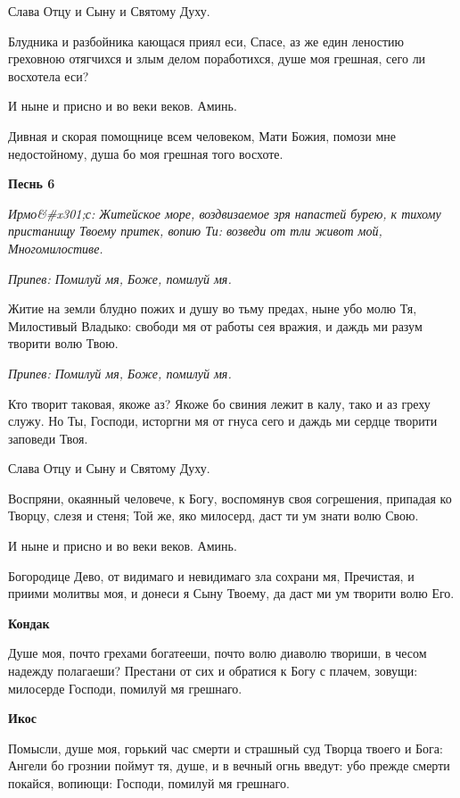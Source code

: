 Слава Отцу и Сыну и Святому Духу.


Блудника и разбойника кающася приял еси, Спасе, аз же един леностию греховною отягчихся и злым делом поработихся, душе моя грешная, сего ли восхотела еси?


И ныне и присно и во веки веков. Аминь.


Дивная и скорая помощнице всем человеком, Мати Божия, помози мне недостойному, душа бо моя грешная того восхоте.




\bfseries Песнь 6\normalfont{}


\itshape Ирмо&#x301;с:\normalfont{} Житейское море, воздвизаемое зря напастей бурею, к тихому пристанищу Твоему притек, вопию Ти: возведи от тли живот мой, Многомилостиве.


\itshape Припев:\normalfont{} Помилуй мя, Боже, помилуй мя.


Житие на земли блудно пожих и душу во тьму предах, ныне убо молю Тя, Милостивый Владыко: свободи мя от работы сея вражия, и даждь ми разум творити волю Твою.


\itshape Припев:\normalfont{} Помилуй мя, Боже, помилуй мя.


Кто творит таковая, якоже аз? Якоже бо свиния лежит в калу, тако и аз греху служу. Но Ты, Господи, исторгни мя от гнуса сего и даждь ми сердце творити заповеди Твоя.


Слава Отцу и Сыну и Святому Духу.


Воспряни, окаянный человече, к Богу, воспомянув своя согрешения, припадая ко Творцу, слезя и стеня; Той же, яко милосерд, даст ти ум знати волю Свою.


И ныне и присно и во веки веков. Аминь.


Богородице Дево, от видимаго и невидимаго зла сохрани мя, Пречистая, и приими молитвы моя, и донеси я Сыну Твоему, да даст ми ум творити волю Его.




\bfseries Кондак\normalfont{}


Душе моя, почто грехами богатееши, почто волю диаволю твориши, в чесом надежду полагаеши? Престани от сих и обратися к Богу с плачем, зовущи: милосерде Господи, помилуй мя грешнаго.




\bfseries Икос\normalfont{}


Помысли, душе моя, горький час смерти и страшный суд Творца твоего и Бога: Ангели бо грознии поймут тя, душе, и в вечный огнь введут: убо прежде смерти покайся, вопиющи: Господи, помилуй мя грешнаго.




